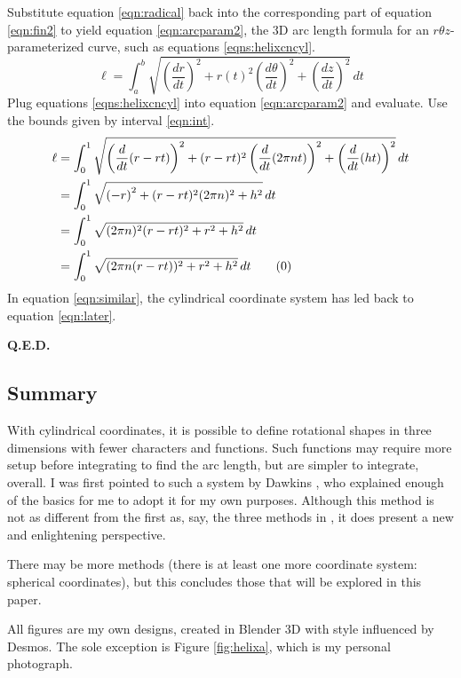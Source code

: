 \documentclass{article}
\begin{document}
Substitute equation \ref{eqn:radical} back into the corresponding part of equation \ref{eqn:fin2} to yield equation \ref{eqn:arcparam2}, the 3D arc length formula for an $r\theta z$-parameterized curve, such as equations \ref{eqns:helixcncyl}.
\begin{equation}\label{eqn:arcparam2}
    \ell = \int_a^b\sqrt{\left(\frac{dr}{dt}\right)^2+r(t)^2\left(\frac{d\theta}{dt}\right)^2+\left(\frac{dz}{dt}\right)^2}\, dt
\end{equation}
Plug equations \ref{eqns:helixcncyl} into equation \ref{eqn:arcparam2} and evaluate. Use the bounds given by interval \ref{eqn:int}.
\begin{align*}
    \ell &= \int_0^1\sqrt{\left(\frac{d}{dt}(r-rt)\right)^2+(r-rt)^2\left(\frac{d}{dt}(2\pi nt)\right)^2+\left(\frac{d}{dt}(ht)\right)^2}\, dt\\
    &= \int_0^1\sqrt{\left(-r\right)^2+(r-rt)^2(2\pi n)^2+h^2}\, dt\\
    &= \int_0^1\sqrt{(2\pi n)^2(r-rt)^2+r^2+h^2}\, dt\\
    &= \int_0^1\sqrt{(2\pi n(r-rt))^2+r^2+h^2}\, dt\tag{\theequation}\label{eqn:similar}
    \stepcounter{equation}
\end{align*}
In equation \ref{eqn:similar}, the cylindrical coordinate system has led back to equation \ref{eqn:later}.
\begin{flushright}
    \textbf{Q.E.D.}
\end{flushright}


\subsection{Summary}
With cylindrical coordinates, it is possible to define rotational shapes in three dimensions with fewer characters and functions. Such functions may require more setup before integrating to find the arc length, but are simpler to integrate, overall. I was first pointed to such a system by Dawkins \cite{Bib:cylcords}, who explained enough of the basics for me to adopt it for my own purposes. Although this method is not as different from the first as, say, the three methods in \cite{Bib:SORVolumes}, it does present a new and enlightening perspective.\par
There may be more methods (there is at least one more coordinate system: spherical coordinates), but this concludes those that will be explored in this paper.
\newpage



\setcounter{secnumdepth}{0}


All figures are my own designs, created in Blender 3D with style influenced by Desmos. The sole exception is Figure \ref{fig:helixa}, which is my personal photograph.
\end{document}
